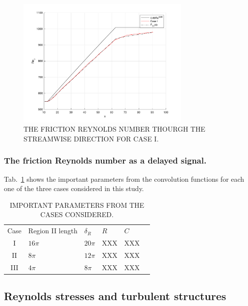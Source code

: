 \documentclass[twocolumn,10pt]{asme2e}
\begin{document}
\begin{figure}[!htbp]
\begin{center}
\setlength{\unitlength}{0.012500in}%
  \includegraphics[trim = 20mm 15mm 20mm 10mm, width = 85mm]{convolution_CI.pdf}
\end{center}
  \caption{THE FRICTION REYNOLDS NUMBER THOURGH THE STREAMWISE DIRECTION FOR CASE I.}
  \label{fig:re_t_x}
\end{figure}

\subsubsection*{The friction Reynolds number as a delayed signal.} 



Tab.~\ref{table_conv} shows the important parameters from the convolution functions for each one of the three cases considered in this study.

\begin{table}[t]
\caption{IMPORTANT PARAMETERS FROM THE CASES CONSIDERED.}
\begin{center}
\centering
\label{table_conv}
\begin{tabular}{c l l l l l}
& & & & \\ %
\hline
Case	&	Region II length	&	\({\delta}_R\)	&	\(R\)	&	\(C\) \\
\hline
I	&	        \(16{\pi}\)	&	\(20{\pi}\)	&	XXX	&	XXX \\
II	&	        \(8{\pi}\)		&	\(12{\pi}\)	&	XXX	&	XXX \\
III	&	        \(4{\pi}\)		&	\(8{\pi}\)	&	XXX	&	XXX \\
\hline
\end{tabular}
\end{center}
\end{table}

\subsection*{Reynolds stresses and turbulent structures}
\end{document}
